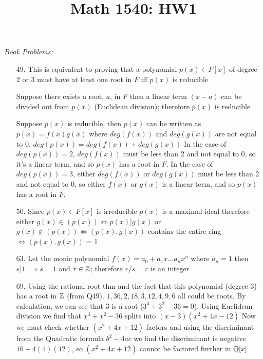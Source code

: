 \documentclass{article}
\title{Math 1540: HW1}
\begin{document}
\maketitle
\emph{Book Problems:}
\begin{enumerate}
    \item[49.] This is equivalent to proving that a polynomial \(p(x) \in F[x]\) of degree 2 or 3 must have at least one root in \(F\)  iff \(p(x)\) is reducible
    
    Suppose there exists a root, \(a\), in \(F\) then a linear term \((x - a)\) can be divided out from \(p(x)\) (Euclidean division); therefore \(p(x)\) is reducible
    
    Suppose \(p(x)\) is reducible, then \(p(x)\) can be written as \(p(x) = f(x)g(x)\) where \(deg(f(x))\) and \(deg(g(x))\) are not equal to \(0\). \(deg(p(x)) = deg(f(x)) + deg(g(x))\) In the case of \(deg(p(x))= 2\), \(deg(f(x))\) must be less than 2 and not equal to 0, so it's a linear term, and so \(p(x)\) has a root in \(F\). In the case of \(deg(p(x))= 3\), either \(deg(f(x))\) or \(deg(g(x))\) must be less than 2 and not equal to 0, so either \(f(x)\) or \(g(x)\) is a linear term, and so \(p(x)\) has a root in \(F\).

    \item[50.] Since \(p(x) \in F[x]\) is irreducible \(p(x)\) is a maximal ideal therefore either \(g(x) \in (p(x)) \iff p(x)|g(x)\) or \(g(x) \notin (p(x)) \iff (p(x), g(x))\) contains the entire ring \(\iff (p(x), g(x))\) = 1

    \item[63.] Let the monic polynomial \(f(x) = a_0 + a_1 x \ldots a_n x^n\) where \(a_n = 1\) then \(s | 1 \implies s = 1\) and \(r \in \mathbb{Z}\); therefore \(r/s = r\) is an integer

    \item[69.] Using the rational root thm and the fact that this polynomial (degree 3) has a root in \(\mathbb{Z}\) (from Q49). \(1,36,2,18,3,12,4,9,6\) all could be roots. By calculation, we can see that 3 is a root (\(3^3 + 3^2 - 36 = 0\)). Using Euclidean division we find that \(x^3 + x^2 - 36\) splits into \((x-3)(x^2 + 4x - 12)\) Now we must check whether \((x^2 + 4x + 12)\) factors and using the discriminant from the Quadratic formula \(b^2 - 4ac\) we find the discriminant is negative \(16 - 4(1)(12)\), so \((x^2 + 4x + 12)\) cannot be factored further in \(\mathbb{Q}[x]\)  
\end{enumerate}
\end{document}
